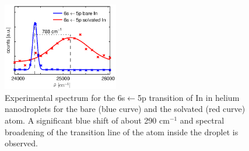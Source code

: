 \documentclass[twoside,twocolumn,9pt]{article}
\begin{document}
\begin{figure}[htbp!]
  	\begin{center}
 		\includegraphics[width=0.45\textwidth]{2.eps}
                \caption{Experimental spectrum for the 6s$\leftarrow{}$5p  transition of In in helium nanodroplets for the bare (blue curve) and the solvated (red curve) atom. A significant blue shift of about 290 cm$^{-1}$ and spectral broadening of the transition line of the atom inside the droplet is observed. \label{pic:exp}}
  	\end{center}
\end{figure}
\end{document}
